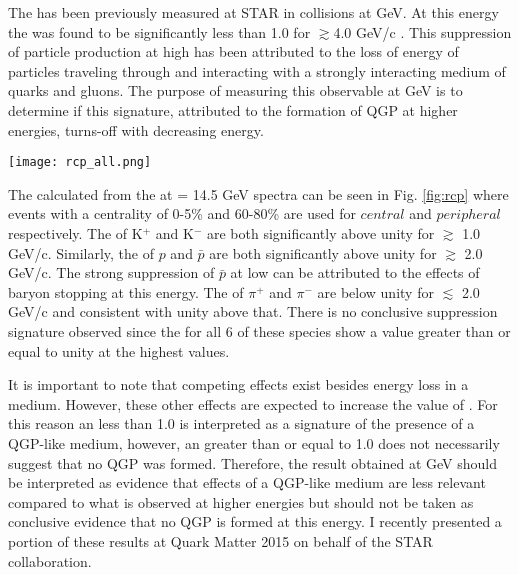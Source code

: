 	The \rcp has been previously measured at STAR in \auau collisions at  GeV. At this energy the \rcp was found to be significantly less than 1.0 for \pt $\gtrsim$4.0 GeV/c \cite{starcollaboration_transversemomentum_2003}. This suppression of particle production at high \pt has been attributed to the loss of energy of particles traveling through and interacting with a strongly interacting medium of quarks and gluons. The purpose of measuring this observable at  GeV is to determine if this signature, attributed to the formation of QGP at higher \snn energies, turns-off with decreasing \snn energy.

	\begin{sidewaysfigure}[p]
		\centering 
		\texttt{[image: rcp\_all.png]} 

		\centering
		\caption{ \label{fig:rcp} The \rcp for \auau at  GeV for events with a centrality of (C=)0-5\% over those with (P=)60-80\%\cite{brandenburg_identified}. The large (red) error bar on the right hand side of each plot corresponds to the correlated uncertainty due to the MC Glauber calculation of $N_{coll}$ (See Section \ref{sec:mc_glauber}. } 
	\end{sidewaysfigure}
	\afterpage{\clearpage}


	The \rcp calculated from the \auau at \snn = 14.5 GeV spectra can be seen in Fig. \ref{fig:rcp} where events with a centrality of 0-5\% and 60-80\% are used for $central$ and $peripheral$ respectively. The \rcp of K$^+$ and K$^-$ are both significantly above unity for \pt $\gtrsim$ 1.0 GeV/c. Similarly, the \rcp of $p$ and $\bar{p}$ are both significantly above unity for \pt $\gtrsim$ 2.0 GeV/c. The strong suppression of $\bar{p}$ at low \pt can be attributed to the effects of baryon stopping at this \snn energy. The \rcp of $\pi^{+}$ and $\pi^{-}$ are below unity for \pt $\lesssim$ 2.0 GeV/c and consistent with unity above that. There is no conclusive suppression signature observed since the \rcp for all 6 of these species show a value greater than or equal to unity at the highest \pt values. 

	It is important to note that competing effects exist besides energy loss in a medium. However, these other effects are expected to increase the value of \rcp. For this reason an \rcp less than 1.0 is interpreted as a signature of the presence of a QGP-like medium, however, an \rcp greater than or equal to 1.0 does not necessarily suggest that no QGP was formed. Therefore, the \rcp result obtained at  GeV should be interpreted as evidence that effects of a QGP-like medium are less relevant compared to what is observed at higher \snn energies but should not be taken as conclusive evidence that no QGP is formed at this energy. I recently presented a portion of these results at Quark Matter 2015 on behalf of the STAR collaboration\cite{brandenburg_identified}.